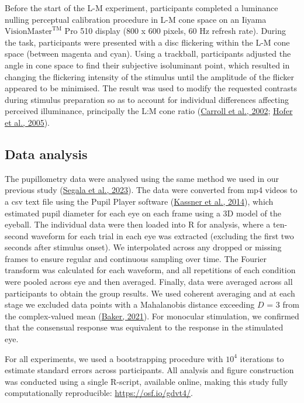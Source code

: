 \documentclass[
]{article}
\begin{document}
Before the start of the L-M experiment, participants completed a luminance nulling perceptual calibration procedure in L-M cone space on an Iiyama \(\textrm{VisionMaster}^{\textrm{TM}}\) Pro 510 display (800 x 600 pixels, 60 Hz refresh rate). During the task, participants were presented with a disc flickering within the L-M cone space (between magenta and cyan). Using a trackball, participants adjusted the angle in cone space to find their subjective isoluminant point, which resulted in changing the flickering intensity of the stimulus until the amplitude of the flicker appeared to be minimised. The result was used to modify the requested contrasts during stimulus preparation so as to account for individual differences affecting perceived illuminance, principally the L:M cone ratio (\protect\hyperlink{ref-Carroll2002}{Carroll et al., 2002}; \protect\hyperlink{ref-Hofer2005}{Hofer et al., 2005}).

\hypertarget{data-analysis}{%
\subsection{Data analysis}\label{data-analysis}}

The pupillometry data were analysed using the same method we used in our previous study (\protect\hyperlink{ref-Segala2023}{Segala et al., 2023}). The data were converted from mp4 videos to a csv text file using the Pupil Player software (\protect\hyperlink{ref-Kassner2014}{Kassner et al., 2014}), which estimated pupil diameter for each eye on each frame using a 3D model of the eyeball. The individual data were then loaded into R for analysis, where a ten-second waveform for each trial in each eye was extracted (excluding the first two seconds after stimulus onset). We interpolated across any dropped or missing frames to ensure regular and continuous sampling over time. The Fourier transform was calculated for each waveform, and all repetitions of each condition were pooled across eye and then averaged. Finally, data were averaged across all participants to obtain the group results. We used coherent averaging and at each stage we excluded data points with a Mahalanobis distance exceeding \(D\) = 3 from the complex-valued mean (\protect\hyperlink{ref-Baker2021}{Baker, 2021}). For monocular stimulation, we confirmed that the consensual response was equivalent to the response in the stimulated eye.

For all experiments, we used a bootstrapping procedure with \ensuremath{10^{4}} iterations to estimate standard errors across participants. All analysis and figure construction was conducted using a single R-script, available online, making this study fully computationally reproducible: \url{https://osf.io/gdvt4/}.
\end{document}
